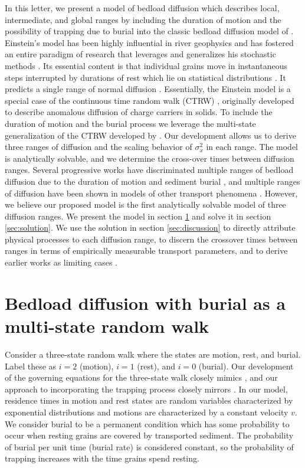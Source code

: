 \documentclass[]{agujournal2018}
\begin{document}
In this letter, we present a model of bedload diffusion which describes local, intermediate, and global ranges by including the duration of motion and the possibility of trapping due to burial into the classic bedload diffusion model of \citet{Einstein1937}.
Einstein's model has been highly influential in river geophysics and has fostered an entire paradigm of research that leverages and generalizes his stochastic methods \citep[e.g.][]{Hubbell1964, Yano1969, Yang1971, Gordon1972, Nakagawa1976}.
Its essential content is that individual grains move in instantaneous steps interrupted by durations of rest which lie on statistical distributions \citep{Hassan1991}.
It predicts a single range of normal diffusion \citep{Einstein1937, Nakagawa1976}.
Essentially, the Einstein model is a special case of the continuous time random walk (CTRW) \citep{Montroll1965}, originally developed to describe anomalous diffusion of charge carriers in solids.
To include the duration of motion and the burial process we leverage the multi-state generalization of the CTRW developed by \citet{Weiss1976, Weiss1994}.
Our development allows us to derive three ranges of diffusion and the scaling behavior of $\sigma_x^2$ in each range. The model is analytically solvable, and we determine the cross-over times between diffusion ranges.
Several progressive works have discriminated multiple ranges of bedload diffusion due to the duration of motion \citep{Lisle1998} and sediment burial \citep{Wu2019}, and multiple ranges of diffusion have been shown in models of other transport phenomena \cite[e.g.][]{Bena2006, Balakrishnan1988, Flekkøy2017, AaraoReis2014}.
However, we believe our proposed model is the first analytically solvable model of three diffusion ranges.
We present the model in section \ref{sec:model} and solve it in section \ref{sec:solution}.
We use the solution in section \ref{sec:discussion} to directly attribute physical processes to each diffusion range, to discern the crossover times between ranges in terms of empirically measurable transport parameters, and to derive earlier works as limiting cases \citep[e.g.][]{Lisle1998,Wu2019,Einstein1937}.

\section{Bedload diffusion with burial as a multi-state random walk}
\label{sec:model}
Consider a three-state random walk where the states are motion, rest, and burial.
Label these as $i=2$ (motion), $i=1$ (rest), and $i=0$ (burial).
Our development of the governing equations for the three-state walk closely mimics \citet{Weiss1994}, and our approach to incorporating the trapping process closely mirrors \citet{Schmidt2007}. 
In our model, residence times in motion and rest states are random variables characterized by exponential distributions and motions are characterized by a constant velocity $v$.
We consider burial to be a permanent condition which has some probability to occur when resting grains are covered by transported sediment.
The probability of burial per unit time (burial rate) is considered constant, so the probability of trapping increases with the time grains spend resting.
\end{document}
